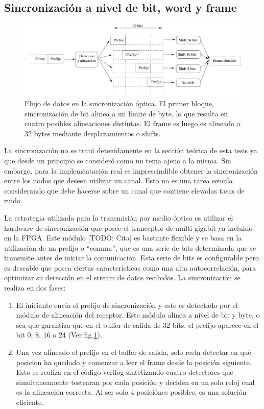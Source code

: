 \subsection{Sincronización a nivel de bit, word y frame}

\begin{figure}[t]
  \centering
    \includegraphics[width=6in]{graphs/optsync.pdf}
\caption {Flujo de datos en la sincronización óptica. El primer bloque, sincronización de bit alinea a un límite de byte, lo que resulta en cuatro posibles alineaciones distintas. El frame es luego es alineado a 32 bytes mediante desplazamientos o shifts.}
\label{fig:optsync}
\end{figure}


La sincronización no se trató detenidamente en la sección teórica de esta tesis ya que desde un principio se consideró como un tema ajeno a la misma. Sin embargo, para la implementación real es imprescindible obtener la sincronización entre los nodos que deseen utilizar un canal. Esto no es una tarea sencila considerando que debe hacerse sobre un canal que contiene elevadas tasas de ruido.

La estrategia utilizada para la transmisión por medio óptico es utilizar el hardware de sincronización que posee el tranceptor de multi-gigabit ya incluido en la FPGA. Este módulo [TODO: Cita] es bastante flexible y se basa en la utilización de un prefijo o ``comma'', que es una serie de bits determinada que se transmite antes de iniciar la comunicación. Esta serie de bits es configurable pero es deseable que posea ciertas características como una alta autocorrelación, para optimizar su detección en el stream de datos recibidos.
La sincronización se realiza en dos fases:
\begin{enumerate}
 \item El iniciante envía el prefijo de sincronización y este es detectado por el módulo de alineación del receptor. Este módulo alinea a nivel de bit y byte, o sea que garantiza que en el buffer de salida de 32 bits, el prefijo aparece en el bit 0, 8, 16 o 24 (Ver fig.\ref{fig:optsync}).
 \item Una vez alineado el prefijo en el buffer de salida, solo resta detectar en qué posicion ha quedado y comenzar a leer el frame desde la posición siguiente. Esto se realiza en el código verilog sintetizando cuatro detectores que simultaneamente testearan por cada posición y deciden en un solo reloj cual es la alineación correcta. Al ser solo 4 posiciónes posibles, es una solución eficiente.
\end{enumerate}


